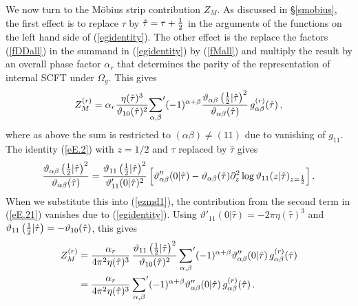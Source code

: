 \documentclass[12pt,a4paper]{article}
\newcommand{\be}{\begin{equation}}
\newcommand{\ee}{\end{equation}}
\newcommand{\refb}[1]{(\ref{#1})}
\newcommand{\p}{\partial}
\def\({\left(}
\def\){\right)}
\def\[{\left[}
\def\]{\right]}
\newcommand{\vt}{\vartheta}
\def\gr{g^{(r)}}
\def\Zr{Z^{(r)}}
\def\htau{\hat\tau}
\newcommand{\oo}{{$\Omega_g$}}
\begin{document}
We now turn to the M\"{o}bius strip contribution $Z_{M}$. As discussed in \S\ref{smobius},
the first effect is to replace $\tau$ by $\htau=\tau+{1\over 2}$ in the arguments of the functions on the
left hand side of  \refb{egidentity}. The other effect is the replace the factors
\refb{fDDall} in the summand in \refb{egidentity} by
\refb{fMall} and multiply the result by an overall phase
factor $\alpha_r$ that determines the parity of the representation of internal SCFT under
\oo. This gives
\be \label{ezmd1}
\Zr_{M}= \alpha_r {\eta(\htau)^3\over \vt_{10}(\htau)^2}
{\sum_{\alpha,\beta}}' (-1)^{\alpha+\beta} {\vt_{\alpha\beta}\({1\over 2}|\htau\)^2
\over \vt_{\alpha\beta}(\htau)}\, \gr_{\alpha\beta}(\htau)\, ,
\ee
where as above the sum is restricted to $(\alpha\beta)\ne (11)$ due to
vanishing of $g_{11}$. The identity \refb{eE.2} with $z=1/2$ and $\tau$ replaced by $\htau$
gives
\be\label{eE.21}
{\vt_{\alpha\beta}\({1\over 2}|\htau\)^2
\over  \vt_{\alpha\beta}(\htau)}= {\vt_{11}\({1\over 2} |\htau\)^2\over
\vt'_{11}(0|\htau)^2}
\[{\vt''_{\alpha\beta}(0|\htau)
} - \vt_{\alpha\beta}(\htau) \p_z^2 \log \vt_{11}(z|\htau)_{z={1\over 2}}\] .
\ee
When we substitute this into \refb{ezmd1}, the contribution from the second
term in \refb{eE.21} vanishes due to
\refb{egidentity}. Using $\vt'_{11}(0|\htau)=-2\pi \eta(\htau)^3$ and $\vt_{11}\({1\over 2}|\htau\)=-\vt_{10}(\htau)$,
this gives
\be
\label{eE.13}
\begin{split}
\Zr_{M} & = {\alpha_r \over 4\pi^2 \eta(\htau)^3}\,
{\vt_{11}\({1\over 2}|\htau\)^2\over \vt_{10}(\htau)^2}\,
{\sum_{\alpha,\beta}}' (-1)^{\alpha+\beta} \vt''_{\alpha\beta}(0|\htau)\,
\gr_{\alpha\beta}(\htau)
\\
& = {\alpha_r\over 4\pi^2 \eta(\htau)^3}\,
{\sum_{\alpha,\beta}}' (-1)^{\alpha+\beta} \vt''_{\alpha\beta}(0|\htau)\,
\gr_{\alpha\beta}(\htau)\, .
\end{split}
\ee
\end{document}
